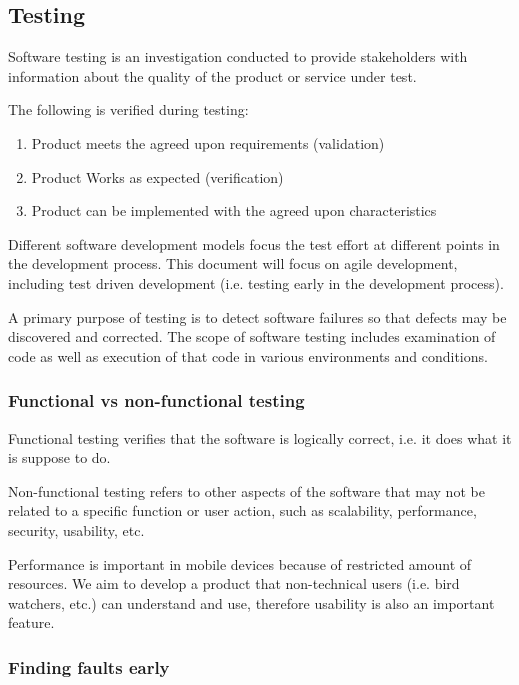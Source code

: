 \subsection{Testing}

Software testing is an investigation conducted to provide stakeholders with
information about the quality of the product or service under
test.\cite{wiki:software-testing}

The following is verified during testing:
\begin{enumerate}
	\item Product meets the agreed upon requirements (validation)
	\item Product Works as expected (verification)
	\item Product can be implemented with the agreed upon characteristics
\end{enumerate}

Different software development models focus the test effort at different
points in the development process. This document will focus on agile
development, including test driven development (i.e. testing early in 
the development process).

A primary purpose of testing is to detect software failures so that
defects may be discovered and corrected. The scope of software testing
includes examination of code as well as execution of that code in
various environments and conditions.

\subsubsection{Functional vs non-functional testing}

Functional testing verifies that the software is logically correct, 
i.e. it does what it is suppose to do.

Non-functional testing refers to other aspects of the software that
may not be related to a specific function or user action, such as 
scalability, performance, security, usability, etc.

Performance is important in mobile devices because of restricted amount of
resources. We aim to develop a product that non-technical users (i.e.  bird
watchers, etc.) can understand and use, therefore usability is also an
important feature.

\subsubsection{Finding faults early}

